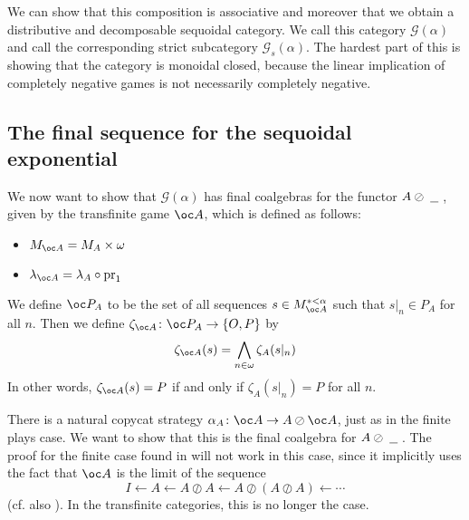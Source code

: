 \documentclass[a4paper,UKenglish]{lipics-v2016}
\theoremstyle{plain}
\theoremstyle{definition}
\newcommand*\from{\colon}
\DeclareMathOperator{\pr}{pr}
\newcommand{\sequoid}{\oslash}
\newcommand{\G}{\mathcal G}
\newcommand{\OP}{\{O,P\}}
\newcommand{\blank}{\;\underline{\hspace{1.5ex}}\;}
\newlength{\arrow}
\begin{document}
We can show that this composition is associative and moreover that we obtain a distributive and decomposable sequoidal category.  We call this category $\G(\alpha)$ and call the corresponding strict subcategory $\G_s(\alpha)$.  The hardest part of this is showing that the category is monoidal closed, because the linear implication of completely negative games is not necessarily completely negative.  

\subsection{The final sequence for the sequoidal exponential}

We now want to show that $\G(\alpha)$ has final coalgebras for the functor $A\sequoid\blank$, given by the transfinite game $\oc A$, which is defined as follows:
\begin{itemize}
  \item $M_{\oc A} = M_A \times \omega$
  \item $\lambda_{\oc A} = \lambda_A \circ \pr_1$
\end{itemize}
We define $\oc P_A$ to be the set of all sequences $s\in M_{\oc A}^{*<\alpha}$ such that $s\vert_n\in P_A$ for all $n$.  Then we define $\zeta_{\oc A}\from\oc P_A\to\OP$ by
\[
  \zeta_{\oc A}(s) = \bigwedge_{n\in\omega}\zeta_A(s\vert_n)
  \]
In other words, $\zeta_{\oc A}(s)=P$ if and only if $\zeta_A(s\vert_n)=P$ for all $n$.

There is a natural copycat strategy $\alpha_A\from \oc A \to A \sequoid \oc A$, just as in the finite plays case.  We want to show that this is the final coalgebra for $A\sequoid\blank$.  The proof for the finite case found in \cite{martinsthesis} will not work in this case, since it implicitly uses the fact that $\oc A$ is the limit of the sequence
\[
  I \leftarrow A \leftarrow A \sequoid A \leftarrow A \sequoid (A \sequoid A) \leftarrow \cdots
  \]
(cf. also \cite{MelliesCofCommCom}).  In the transfinite categories, this is no longer the case.  
\end{document}
